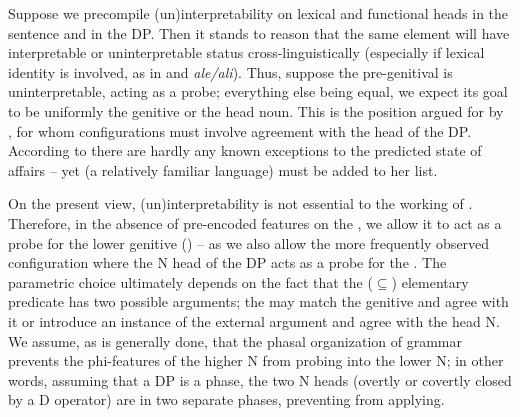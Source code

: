 \documentclass[output=paper]{langsci/langscibook}
\begin{document}
Suppose we precompile (un)interpretability on lexical and functional heads in the sentence and in the DP. Then it stands to reason that the same element will have interpretable or uninterpretable status cross-linguistically (especially if lexical identity is involved, as in  and  \textit{ale\slash ali}). Thus, suppose the pre-genitival  is uninterpretable, acting as a probe; everything else being equal, we expect its goal to be uniformly the genitive or the head noun. This is the position argued for by \citet{Philip2012}, for whom  configurations must involve agreement with the head of the DP. According to \citet{Philip2012} there are hardly any known exceptions to the predicted state of affairs – yet  (a relatively familiar language) must be added to her list.\largerpage

On the present view, (un)interpretability is not essential to the working of . Therefore, in the absence of pre-encoded features on the , we allow it to act as a probe for the lower genitive () – as we also allow the more frequently observed configuration where the N head of the DP acts as a probe for the . The parametric choice ultimately depends on the fact that the ($\subseteq$) elementary predicate has two possible arguments; the  may match the genitive and agree with it or introduce an instance of the external argument and agree with the head N. We assume, as is generally done, that the phasal organization of grammar prevents the phi-features of the higher N from probing into the lower N; in other words, assuming that a DP is a phase, the two N heads (overtly or covertly closed by a D operator) are in two separate phases, preventing  from applying.\largerpage[2]
\end{document}
